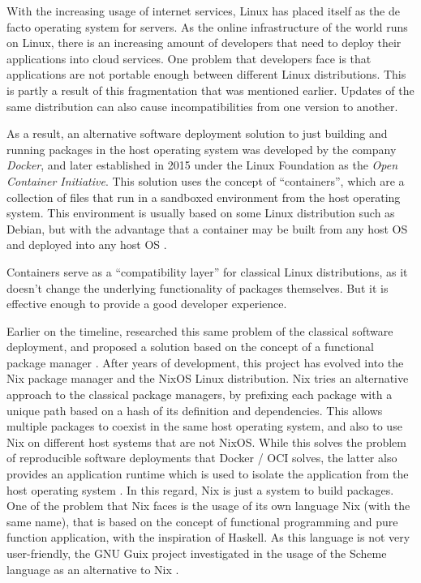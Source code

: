 With the increasing usage of internet services, Linux has
placed itself as the de facto operating system for servers.
As the online infrastructure of the world runs on Linux,
there is an increasing amount of developers that need to
deploy their applications into cloud services. One problem
that developers face is that applications are not portable
enough between different Linux distributions. This is partly
a result of this fragmentation that was mentioned earlier.
Updates of the same distribution can also cause
incompatibilities from one version to another.

As a result, an alternative software deployment solution to
just building and running packages in the host operating
system was developed by the company \textit{Docker}, and
later established in 2015 under the Linux Foundation as the
\textit{Open Container Initiative}. This solution uses the
concept of ``containers'', which are a collection of files
that run in a sandboxed environment from the host operating
system. This environment is usually based on some Linux
distribution such as Debian, but with the advantage that a
container may be built from any host \ac{OS} and deployed
into any host \ac{OS} .

Containers serve as a ``compatibility layer'' for classical
Linux distributions, as it doesn't change the underlying
functionality of packages themselves. But it is effective
enough to provide a good developer experience.

Earlier on the timeline, \citeauthor{dolstraNixOS2008}
researched this same problem of the classical software
deployment, and proposed a solution based on the concept of
a functional package manager \cite{dolstraNixOS2008} . After
years of development, this project has evolved into the Nix
package manager and the NixOS Linux distribution. Nix tries
an alternative approach to the classical package managers,
by prefixing each package with a unique path based on a hash
of its definition and dependencies. This allows multiple
packages to coexist in the same host operating system, and
also to use Nix on different host systems that are not
NixOS. While this solves the problem of reproducible
software deployments that Docker / OCI solves, the latter
also provides an application runtime which is used to
isolate the application from the host operating system \cite{espePerformanceEvaluationContainer2020}. In
this regard, Nix is just a system to build packages. One of
the problem that Nix faces is the usage of its own
language Nix (with the same name), that is based on the
concept of functional programming and pure function
application, with the inspiration of Haskell. As this
language is not very user-friendly, the GNU Guix project
investigated in the usage of the Scheme language as an
alternative to Nix
\cite{courtesFunctionalPackageManagement2013} .

